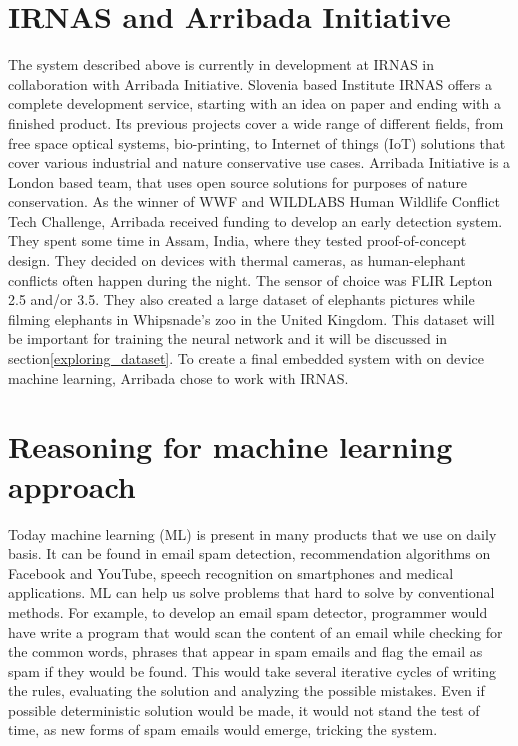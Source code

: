 \section{ IRNAS and Arribada Initiative}\label{arribada_init}

The system described above is currently in development at IRNAS in collaboration with Arribada Initiative.
Slovenia based Institute IRNAS offers a complete development service, starting with an idea on paper and ending with a finished product. 
Its previous projects cover a wide range of different fields, from free space optical systems, bio-printing, to Internet of things (IoT) solutions that cover various industrial and nature conservative use cases.
Arribada Initiative is a London based team, that uses open source solutions for purposes of nature conservation.
As the winner of WWF and WILDLABS Human Wildlife Conflict Tech Challenge\cite{wildlabs-winners}, Arribada received funding to develop an early detection system.
They spent some time in Assam, India, where they tested proof-of-concept design\cite{arribada-assam}.
They decided on devices with thermal cameras, as human-elephant conflicts often happen during the night.
The sensor of choice was FLIR Lepton 2.5 and/or 3.5.
They also created a large dataset of elephants pictures while filming elephants in Whipsnade's zoo in the United Kingdom. 
This dataset will be important for training the neural network and it will be discussed in section\ref{exploring_dataset}.
To create a final embedded system with on device machine learning, Arribada chose to work with IRNAS.


\section{ Reasoning for machine learning approach}

Today machine learning (ML) is present in many products that we use on daily basis.
It can be found in email spam detection, recommendation algorithms on Facebook and YouTube, speech recognition on smartphones and medical applications.
ML can help us solve problems that hard to solve by conventional methods.
For example, to develop an email spam detector, programmer would have write a program that would scan the content of an email while checking for the common words, phrases that appear in spam emails and flag the email as spam if they would be found.
This would take several iterative cycles of writing the rules, evaluating the solution and analyzing the possible mistakes. 
Even if possible deterministic solution would be made, it would not stand the test of time, as new forms of spam emails would emerge, tricking the system.

